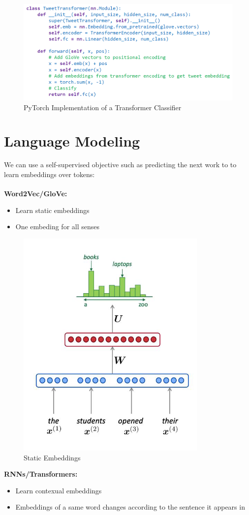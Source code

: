 \begin{figure}[h!t]
    \centering
    \includegraphics[width=0.75\linewidth]{transfomerclassifier.png}
    \caption{PyTorch Implementation of a Transformer Classifier}
    \label{fig:enter-label}
\end{figure}

\newpage

\section{Language Modeling}
We can use a self-supervised objective such as predicting the next work to to learn embeddings over tokens:\\
\noindent
\\\textbf{Word2Vec/GloVe:}
\begin{itemize}
    \item Learn static embeddings
    \item One embeding for all senses
\end{itemize}

\begin{figure}[h!t]
    \centering
    \includegraphics[width=0.35\linewidth]{staticembeddings.png}
    \caption{Static Embeddings}
    \label{fig:enter-label}
\end{figure}

\noindent
\textbf{RNNs/Transformers:}
\begin{itemize}
    \item Learn contexual embeddings 
    \item Embeddings of a same word changes according to the sentence it appears in\\
\end{itemize}
\noindent


